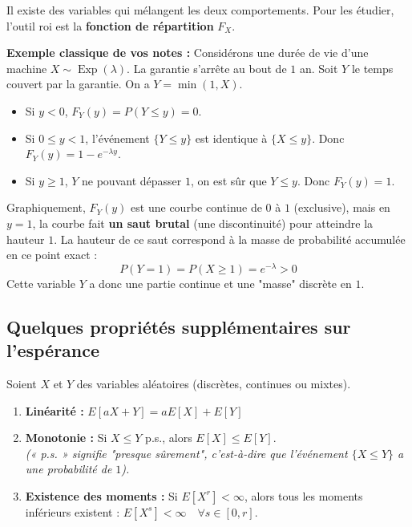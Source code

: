 \begin{remarque}
    Il existe des variables qui mélangent les deux comportements. Pour les étudier, l'outil roi est la \textbf{fonction de répartition} $F_X$.
    
    \textbf{Exemple classique de vos notes :} Considérons une durée de vie d'une machine $X \sim \operatorname{Exp}(\lambda)$. La garantie s'arrête au bout de $1$ an. Soit $Y$ le temps couvert par la garantie. On a $Y = \min(1, X)$.
    \begin{itemize}
        \item Si $y < 0$, $F_Y(y) = P(Y \le y) = 0$.
        \item Si $0 \le y < 1$, l'événement $\{Y \le y\}$ est identique à $\{X \le y\}$. Donc $F_Y(y) = 1 - e^{-\lambda y}$.
        \item Si $y \ge 1$, $Y$ ne pouvant dépasser $1$, on est sûr que $Y \le y$. Donc $F_Y(y) = 1$.
    \end{itemize}
    Graphiquement, $F_Y(y)$ est une courbe continue de $0$ à $1$ (exclusive), mais en $y=1$, la courbe fait \textbf{un saut brutal} (une discontinuité) pour atteindre la hauteur $1$. 
    La hauteur de ce saut correspond à la masse de probabilité accumulée en ce point exact : 
    \[
    P(Y = 1) = P(X \ge 1) = e^{-\lambda} > 0
    \]
    Cette variable $Y$ a donc une partie continue et une "masse" discrète en $1$.
\end{remarque}

\subsection{Quelques propriétés supplémentaires sur l'espérance}

\begin{proposition}
    Soient $X$ et $Y$ des variables aléatoires (discrètes, continues ou mixtes).
    \begin{enumerate}
        \item \textbf{Linéarité :} $E[aX+Y] = aE[X] + E[Y]$
        \item \textbf{Monotonie :} Si $X \le Y$ p.s., alors $E[X] \le E[Y]$. \\
        \textit{(« p.s. » signifie "presque sûrement", c'est-à-dire que l'événement $\{X \le Y\}$ a une probabilité de $1$).}
        \item \textbf{Existence des moments :} Si $E[X^r] < \infty$, alors tous les moments inférieurs existent : $E[X^s] < \infty \quad \forall s \in [0, r]$.
    \end{enumerate}
\end{proposition}
